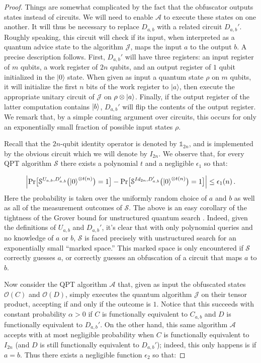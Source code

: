 \documentclass[11pt]{article}
\numberwithin{equation}{section}
\newcommand{\one}{\mathds 1}
\newcommand{\algo}{\mathcal}
\begin{document}
{\begin{proof}
Things are somewhat complicated by the fact that the obfuscator outputs states instead of circuits. We will need to enable $\algo A$ to execute these states on one another. It will thus be necessary to replace $D_{a, b}$ with a related circuit $D_{a, b}'$. Roughly speaking, this circuit will check if its input, when interpreted as a quantum advice state to the algorithm $\algo J$, maps the input $a$ to the output $b$. A precise description follows. First, $D_{a, b}'$ will have three registers: an input register of $m$ qubits, a work register of $2n$ qubits, and an output register of $1$ qubit initialized in the $|0\rangle$ state. When given as input a quantum state $\rho$ on $m$ qubits, it will initialize the first $n$ bits of the work register to $|a\rangle$, then execute the appropriate unitary circuit of $\algo J$ on $\rho \otimes {\left\vert{a}\right\rangle}$. Finally, if the output register of the latter computation contains ${\left\vert{b}\right\rangle}$, $D_{a, b}'$ will flip the contents of the output register. We remark that, by a simple counting argument over circuits, this occurs for only an exponentially small fraction of possible input states $\rho$.

Recall that the $2n$-qubit identity operator is denoted by $\one_{2n}$, and is implemented by the obvious circuit which we will denote by $I_{2n}$. We observe that, for every QPT algorithm $\mathcal S$ there exists a polynomial $t$ and a negligible $\epsilon_1$ so that:

\begin{equation}\label{eqn11}
\Bigl| \text{Pr}\bigl[\mathcal S^{U_{a,b}, D_{a,b}'}\bigl({\left\vert{0}\right\rangle}^{\otimes t(n)}\bigr) = 1\bigr]
- \text{Pr}\bigl[\mathcal S^{Id_{2n}, D_{a,b}'}\bigl({\left\vert{0}\right\rangle}^{\otimes t(n)}\bigr) = 1\bigr] \Bigr| 
\leq \epsilon_1(n)\,.
\end{equation}
Here the probability is taken over the uniformly random choice of $a$ and $b$ as well as all of the measurement outcomes of $\algo S$. The above is an easy corollary of the tightness of the Grover bound for unstructured quantum search \cite{BBBV}. Indeed, given the definitions of $U_{a, b}$ and $D_{a, b}'$, it's clear that with only polynomial queries and no knowledge of $a$ or $b$, $\algo S$ is faced precisely with unstructured search for an exponentially small ``marked space.'' This marked space is only encountered if $\algo S$ correctly guesses $a$, or correctly guesses an obfuscation of a circuit that maps $a$ to $b$.
  
Now consider the QPT algorithm $\mathcal{A}$ that, given as input the obfuscated states $\mathcal{O}(C)$ and $\mathcal{O}(D)$, simply executes the quantum algorithm $\mathcal{J}$ on their tensor product, accepting if and only if the outcome is $1$. Notice that this succeeds with constant probability $\alpha > 0$ if $C$ is functionally equivalent to $C_{a,b}$ and $D$ is functionally equivalent to $D_{a,b}'$. On the other hand, this same algorithm $\algo A$ accepts with at most negligible probability when $C$ is functionally equivalent to $I_{2n}$ (and $D$ is still functionally equivalent to $D_{a, b}'$); indeed, this only happens is if $a = b$. Thus there exists a negligible function $\epsilon_2$ so that:


\end{proof}}
\end{document}
